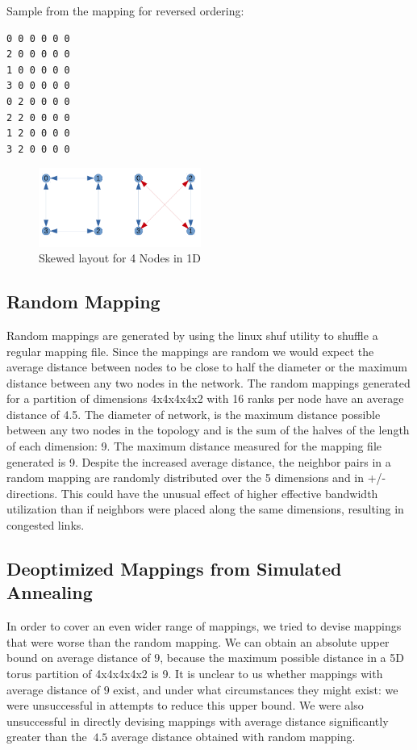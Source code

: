\documentclass{acm_proc_article-sp}
\begin{document}
Sample from the mapping for reversed ordering:
\begin{lstlisting}[frame=lines, basicstyle=\ttfamily,columns=fixed]
0 0 0 0 0 0
2 0 0 0 0 0
1 0 0 0 0 0
3 0 0 0 0 0
0 2 0 0 0 0
2 2 0 0 0 0
1 2 0 0 0 0
3 2 0 0 0 0
\end{lstlisting}


\begin{figure}
  \center
  \includegraphics[width=0.475\textwidth]{skewed_layout_cropped.pdf}
  \caption{Skewed layout for 4 Nodes in 1D}
    \label{fig:Skewed_layout_for_4_Nodes_in_1D}
\end{figure}

\subsection{Random Mapping}
\label{sect:random}

Random mappings are generated by using the linux shuf utility to shuffle a regular mapping file.
Since the mappings are random we would expect the average distance between nodes to be close to half the diameter
or the maximum distance between any two nodes in the network. The random mappings generated for a partition of
dimensions 4x4x4x4x2 with 16 ranks per node have an average distance of 4.5. The diameter of network, is the maximum
distance possible between any two nodes in the topology and is the sum of the halves of the length of each dimension: 9.
The maximum distance measured for the mapping file generated is 9.
Despite the increased average distance, the neighbor pairs in a random mapping are randomly distributed over the 5 dimensions and in +/- directions.
This could have the unusual effect of higher effective bandwidth utilization than if neighbors were placed along the same dimensions, resulting in congested links.

\subsection{Deoptimized Mappings from Simulated Annealing}
In order to cover an even wider range of mappings, we tried to
devise mappings that were worse than the random mapping.
We can obtain an absolute upper bound on average distance of
$9$, because the maximum possible distance in a 5D torus
partition of 4x4x4x4x2 is 9.  It is unclear to us whether
mappings with average distance of $9$ exist, and under what
circumstances they might exist: we were unsuccessful in
attempts to reduce this upper bound.  We were also
unsuccessful in directly devising mappings
with average distance significantly greater than the $~4.5$ average
distance obtained with random mapping.
\end{document}
